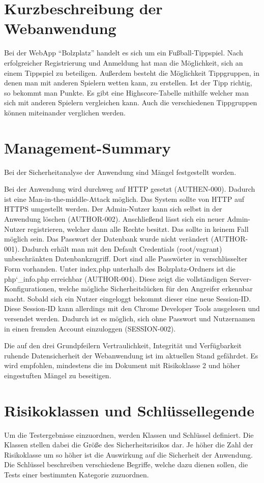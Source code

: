\chapter{Kurzbeschreibung der Webanwendung}
Bei der WebApp “Bolzplatz” handelt es sich um ein Fußball-Tippspiel. Nach erfolgreicher Registrierung und Anmeldung hat man die Möglichkeit, sich an einem Tippspiel zu beteiligen. Außerdem besteht die Möglichkeit Tippgruppen, in denen man mit anderen Spielern wetten kann, zu erstellen. Ist der Tipp richtig, so bekommt man Punkte. Es gibt eine Highscore-Tabelle mithilfe welcher man sich mit anderen Spielern vergleichen kann. Auch die verschiedenen Tippgruppen können miteinander verglichen werden.
\chapter{Management-Summary}
\noindent Bei der Sicherheitanalyse der Anwendung sind Mängel festgestellt worden.

Bei der Anwendung wird durchweg auf HTTP gesetzt (AUTHEN-000). Dadurch ist eine Man-in-the-middle-Attack möglich. Das System sollte von HTTP auf HTTPS umgestellt werden. Der Admin-Nutzer kann sich selbst in der Anwendung löschen (AUTHOR-002). Anschließend lässt sich ein neuer Admin-Nutzer registrieren, welcher dann alle Rechte besitzt. Das sollte in keinem Fall möglich sein.
Das Passwort der Datenbank wurde nicht verändert (AUTHOR-001). Dadurch erhält man mit den Default Credentials (root/vagrant) unbeschränkten Datenbankzugriff. Dort sind alle Passwörter in verschlüsselter Form vorhanden. Unter index.php unterhalb des Bolzplatz-Ordners ist die php\char`_info.php erreichbar (AUTHOR-004). Diese zeigt die vollständigen Server-Konfigurationen, welche mögliche Sicherheitslücken für den Angreifer erkennbar macht.
Sobald sich ein Nutzer eingeloggt bekommt dieser eine neue Session-ID. Diese Session-ID kann allerdings mit den Chrome Developer Tools ausgelesen und versendet werden. Dadurch ist es möglich, sich ohne Passwort und Nutzernamen in einen fremden Account einzuloggen (SESSION-002).

Die auf den drei Grundpfeilern Vertraulichkeit, Integrität und Verfügbarkeit ruhende Datensicherheit der Webanwendung ist im aktuellen Stand gefährdet. Es wird empfohlen, mindestens die im Dokument mit Risikoklasse 2 und höher eingestuften Mängel zu beseitigen.

\chapter{Risikoklassen und Schlüssellegende}
Um die Testergebnisse einzuordnen, werden Klassen und Schlüssel definiert. Die Klassen stellen dabei die Größe des Sicherheitsrisikos dar. Je höher die Zahl der Risikoklasse um so höher ist die Auswirkung auf die Sicherheit der Anwendung. Die Schlüssel beschreiben verschiedene Begriffe, welche dazu dienen sollen, die Tests einer bestimmten Kategorie zuzuordnen.
